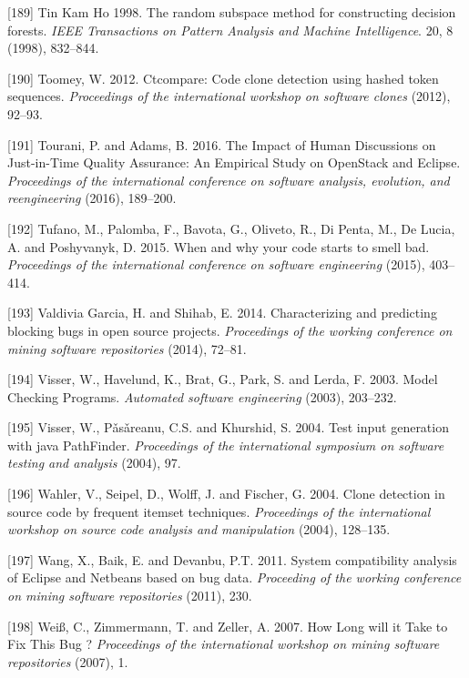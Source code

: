 \documentclass[12pt]{report}
\begin{document}
\hypertarget{ref-TinKamHo1998}{}
{[}189{]} Tin Kam Ho 1998. The random subspace method for constructing
decision forests. \emph{IEEE Transactions on Pattern Analysis and
Machine Intelligence}. 20, 8 (1998), 832--844.

\hypertarget{ref-Toomey2012}{}
{[}190{]} Toomey, W. 2012. Ctcompare: Code clone detection using hashed
token sequences. \emph{Proceedings of the international workshop on
software clones} (2012), 92--93.

\hypertarget{ref-Tourani2016}{}
{[}191{]} Tourani, P. and Adams, B. 2016. The Impact of Human
Discussions on Just-in-Time Quality Assurance: An Empirical Study on
OpenStack and Eclipse. \emph{Proceedings of the international conference
on software analysis, evolution, and reengineering} (2016), 189--200.

\hypertarget{ref-Tufano2015}{}
{[}192{]} Tufano, M., Palomba, F., Bavota, G., Oliveto, R., Di Penta,
M., De Lucia, A. and Poshyvanyk, D. 2015. When and why your code starts
to smell bad. \emph{Proceedings of the international conference on
software engineering} (2015), 403--414.

\hypertarget{ref-ValdiviaGarcia2014}{}
{[}193{]} Valdivia Garcia, H. and Shihab, E. 2014. Characterizing and
predicting blocking bugs in open source projects. \emph{Proceedings of
the working conference on mining software repositories} (2014), 72--81.

\hypertarget{ref-Visser2003}{}
{[}194{]} Visser, W., Havelund, K., Brat, G., Park, S. and Lerda, F.
2003. Model Checking Programs. \emph{Automated software engineering}
(2003), 203--232.

\hypertarget{ref-Visser2004}{}
{[}195{]} Visser, W., Pǎsǎreanu, C.S. and Khurshid, S. 2004. Test input
generation with java PathFinder. \emph{Proceedings of the international
symposium on software testing and analysis} (2004), 97.

\hypertarget{ref-Wahler}{}
{[}196{]} Wahler, V., Seipel, D., Wolff, J. and Fischer, G. 2004. Clone
detection in source code by frequent itemset techniques.
\emph{Proceedings of the international workshop on source code analysis
and manipulation} (2004), 128--135.

\hypertarget{ref-Wang2011}{}
{[}197{]} Wang, X., Baik, E. and Devanbu, P.T. 2011. System
compatibility analysis of Eclipse and Netbeans based on bug data.
\emph{Proceeding of the working conference on mining software
repositories} (2011), 230.

\hypertarget{ref-Weiuxdf2007}{}
{[}198{]} Weiß, C., Zimmermann, T. and Zeller, A. 2007. How Long will it
Take to Fix This Bug ? \emph{Proceedings of the international workshop
on mining software repositories} (2007), 1.
\end{document}
